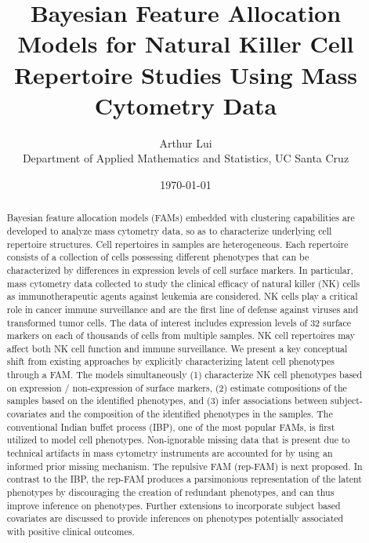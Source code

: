 \documentclass[12pt,]{article}
\title{Bayesian Feature Allocation Models for Natural Killer Cell Repertoire
Studies Using Mass Cytometry Data}
\author{
  Arthur Lui\\
  Department of Applied Mathematics and Statistics, UC Santa Cruz
}
\date{\today}
\begin{document}
\maketitle
\onehalfspacing



\begin{abstract}
\noindent
Bayesian feature allocation models (FAMs) embedded with clustering capabilities
are developed to analyze mass cytometry data, so as to characterize underlying
cell repertoire structures. Cell repertoires in samples are heterogeneous. Each
repertoire consists of a collection of cells possessing different phenotypes
that can be characterized by differences in expression levels of cell surface
markers.  In particular, mass cytometry data collected to study the clinical
efficacy of natural killer (NK) cells as immunotherapeutic agents against
leukemia are considered. NK cells play a critical role in cancer immune
surveillance and are the first line of defense against viruses and transformed
tumor cells.  The data of interest includes expression levels of 32 surface
markers on each of thousands of cells from multiple samples. NK cell
repertoires may affect both NK cell function and immune surveillance. We 
present a key conceptual shift from existing approaches by explicitly
characterizing latent cell phenotypes through a FAM. The models simultaneously
(1) characterize NK cell phenotypes based on expression / non-expression of
surface markers, (2) estimate compositions of the samples based on the
identified phenotypes, and (3) infer associations between subject-covariates
and the composition of the identified phenotypes in the samples.  The
conventional Indian buffet process (IBP), one of the most popular FAMs, is
first utilized to model cell phenotypes.  Non-ignorable missing data that is
present due to technical artifacts in mass cytometry instruments are accounted
for by using an informed prior missing mechanism. The repulsive FAM (rep-FAM)
is next proposed.  In contrast to the IBP, the rep-FAM produces a
parsimonious representation of the latent phenotypes by discouraging the
creation of redundant phenotypes, and can thus improve inference on phenotypes.
Further extensions to incorporate subject based covariates are discussed to
provide inferences on phenotypes potentially associated with positive clinical
outcomes.

\end{abstract}
\end{document}
